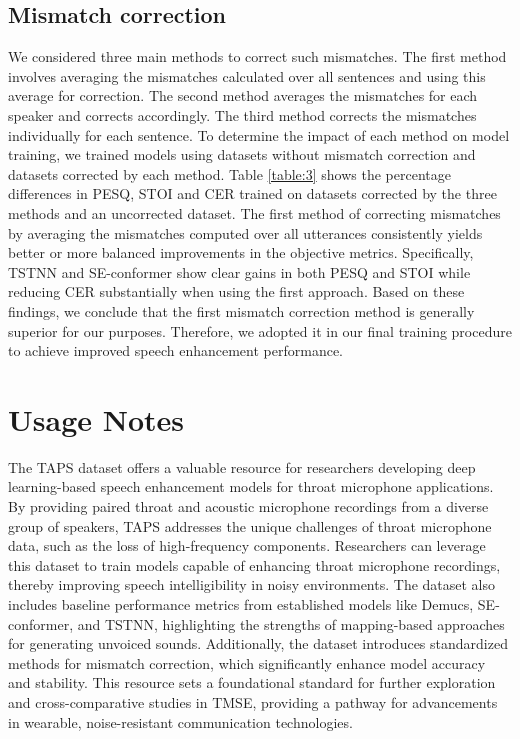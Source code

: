 \documentclass[10pt]{wlscirep}
\begin{document}
\subsection*{Mismatch correction}
We considered three main methods to correct such mismatches. The first method involves averaging the mismatches calculated over all sentences and using this average for correction. The second method averages the mismatches for each speaker and corrects accordingly. The third method corrects the mismatches individually for each sentence. To determine the impact of each method on model training, we trained models using datasets without mismatch correction and datasets corrected by each method. Table \ref{table:3} shows the percentage differences in PESQ, STOI and CER trained on datasets corrected by the three methods and an uncorrected dataset. The first method of correcting mismatches by averaging the mismatches computed over all utterances consistently yields better or more balanced improvements in the objective metrics. Specifically, TSTNN and SE-conformer show clear gains in both PESQ and STOI while reducing CER substantially when using the first approach. Based on these findings, we conclude that the first mismatch correction method is generally superior for our purposes. Therefore, we adopted it in our final training procedure to achieve improved speech enhancement performance.



\section*{Usage Notes}
The TAPS dataset offers a valuable resource for researchers developing deep learning-based speech enhancement models for throat microphone applications. By providing paired throat and acoustic microphone recordings from a diverse group of speakers, TAPS addresses the unique challenges of throat microphone data, such as the loss of high-frequency components. Researchers can leverage this dataset to train models capable of enhancing throat microphone recordings, thereby improving speech intelligibility in noisy environments. The dataset also includes baseline performance metrics from established models like Demucs, SE-conformer, and TSTNN, highlighting the strengths of mapping-based approaches for generating unvoiced sounds. Additionally, the dataset introduces standardized methods for mismatch correction, which significantly enhance model accuracy and stability. This resource sets a foundational standard for further exploration and cross-comparative studies in TMSE, providing a pathway for advancements in wearable, noise-resistant communication technologies.
\end{document}
